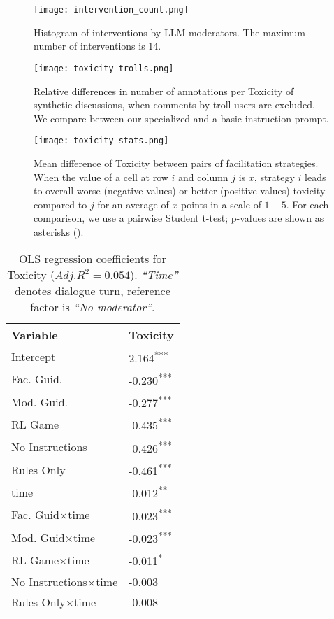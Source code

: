 \begin{figure}[t]
	\centering
	\texttt{[image: intervention\_count.png]}
	\caption{Histogram of interventions by \ac{LLM} moderators. The maximum number of interventions is $14$.}
	\label{fig:intervention_count}
\end{figure}

\begin{figure}[t]
    \centering
    \texttt{[image: toxicity\_trolls.png]}
    \caption{Relative differences in number of annotations per Toxicity of synthetic discussions, when comments by troll users are excluded. We compare between our specialized and a basic instruction prompt.}
    \label{fig:toxicity_trolls}
\end{figure}

\begin{figure}
    \texttt{[image: toxicity\_stats.png]}
	\centering
	\caption{Mean difference of Toxicity between pairs of facilitation strategies. When the value of a cell at row $i$ and column $j$ is $x$, strategy $i$ leads to overall worse (negative values) or better (positive values) toxicity compared to $j$ for an average of $x$ points in a scale of $1-5$. For each comparison, we use a pairwise Student t-test; p-values are shown as asterisks (\asterisknote).}
	\label{fig:toxicity_stats}
\end{figure}

\begin{table}[t]
\centering
    \begin{tabular}{l p{2.5cm}}
        \toprule
        \textbf{Variable} & \textbf{Toxicity} \\
        \midrule
        Intercept & 2.164\textsuperscript{***} \\
        Fac. Guid. & -0.230\textsuperscript{***} \\
        Mod. Guid. & -0.277\textsuperscript{***} \\
        RL Game & -0.435\textsuperscript{***} \\
        No Instructions & -0.426\textsuperscript{***} \\
        Rules Only & -0.461\textsuperscript{***} \\
        time & -0.012\textsuperscript{**} \\
        Fac. Guid$\times$time & -0.023\textsuperscript{***} \\
        Mod. Guid$\times$time & -0.023\textsuperscript{***} \\
        RL Game$\times$time & -0.011\textsuperscript{*} \\
        No Instructions$\times$time & -0.003 \\
        Rules Only$\times$time & -0.008 \\
        \bottomrule
    \end{tabular}
    \small
    \asterisknote
    \normalsize
    \caption{\ac{OLS} regression coefficients for Toxicity ($Adj. R^2=0.054$). \textit{“Time”} denotes dialogue turn, reference factor is \textit{“No moderator”}.}
    \label{tab:toxicity}
\end{table}

